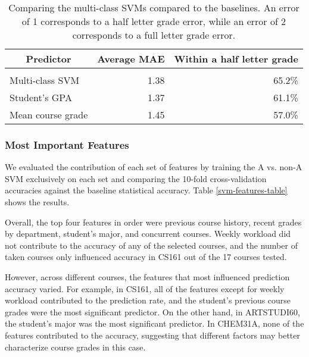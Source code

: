 \begin{table}[htbp]\scriptsize
\label{svm-mae-table}
\begin{center}
\begin{tabular}{lrr}
\multicolumn{1}{c}{\bf Predictor}  &\multicolumn{1}{c}{\bf Average MAE}  &\multicolumn{1}{c}{\bf Within a half letter grade}
\\ \hline \\
Multi-class SVM &1.38 & 65.2\%\\
Student's GPA   &1.37 & 61.1\%\\
Mean course grade &1.45 &57.0\% \\
\end{tabular}
\caption{Comparing the multi-class SVMs compared to the baselines. An error of 1 corresponds to a half letter grade error, while an error of 2 corresponds to a full letter grade error.}
\end{center}
\end{table}


\subsubsection{Most Important Features}

We evaluated the contribution of each set of features by training the A vs. non-A SVM exclusively on each set  and comparing the 10-fold cross-validation accuracies against the baseline statistical accuracy. Table \ref{svm-features-table} shows the results.

Overall, the top four features in order were previous course history, recent grades by department, student's major, and concurrent courses. Weekly workload did not contribute to the accuracy of any of the selected courses, and the number of taken courses only influenced accuracy in CS161 out of the 17 courses tested.

However, across different courses, the features that most influenced prediction accuracy varied. For example, in CS161, all of the features except for weekly workload contributed to the prediction rate, and the student's previous course grades were the most significant predictor. On the other hand, in ARTSTUDI60, the student's major was the most significant predictor. In CHEM31A, none of the features contributed to the accuracy, suggesting that different factors may better characterize course grades in this case.

